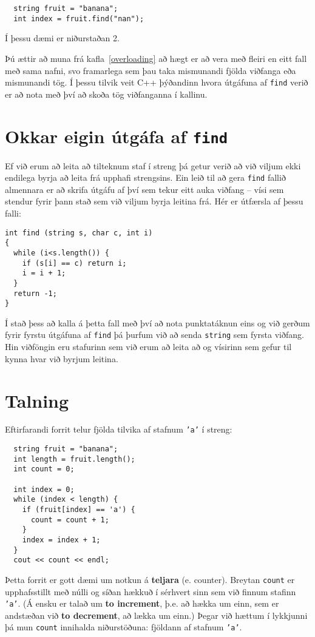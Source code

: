 \begin{verbatim}
  string fruit = "banana";
  int index = fruit.find("nan");
\end{verbatim}
%
Í þessu dæmi er niðurstaðan 2.

Þú ættir að muna frá kafla~\ref{overloading} að hægt er að vera með fleiri en eitt fall með sama nafni,
svo framarlega sem þau taka mismunandi fjölda viðfanga eða mismunandi tög.
Í þessu tilvik veit C++ þýðandinn hvora útgáfuna af {\tt find} verið er að nota með því að skoða tög viðfanganna í kallinu.

\section{Okkar eigin útgáfa af {\tt find}}

Ef við erum að leita að tilteknum staf í streng þá getur verið að við viljum ekki endilega byrja að leita frá upphafi strengsins. 
Ein leið til að gera {\tt find} fallið almennara er að skrifa útgáfu af því sem tekur eitt auka viðfang -- vísi sem stendur fyrir þann stað sem við viljum byrja leitina frá.
Hér er útfærsla af þessu falli:

\begin{verbatim}
int find (string s, char c, int i)
{
  while (i<s.length()) {
    if (s[i] == c) return i;
    i = i + 1;
  }
  return -1;
}
\end{verbatim}
%
Í stað þess að kalla á þetta fall með því að nota punktatáknun eins og við gerðum fyrir fyrstu útgáfuna af {\tt find}
þá þurfum við að senda {\tt string} sem fyrsta viðfang.
Hin viðföngin eru stafurinn sem við erum að leita að og vísirinn sem gefur til kynna hvar við byrjum leitina.

\section{Talning}
\label{loopcount}

Eftirfarandi forrit telur fjölda tilvika af stafnum {\tt 'a'} í streng:

\begin{verbatim}
  string fruit = "banana";
  int length = fruit.length();
  int count = 0;

  int index = 0;
  while (index < length) {
    if (fruit[index] == 'a') {
      count = count + 1;
    }
    index = index + 1;
  }
  cout << count << endl;
\end{verbatim}
%
Þetta forrit er gott dæmi um notkun á {\bf teljara} (e. counter).
Breytan {\tt count} er upphafsstillt með núlli og síðan hækkuð í sérhvert sinn sem við finnum stafinn {\tt 'a'}.
(Á ensku er talað um {\bf to increment}, þ.e. að hækka um einn, sem er andstæðan við {\bf to decrement}, að lækka um einn.)
Þegar við hættum í lykkjunni þá mun {\tt count} innihalda niðurstöðuna: fjöldann af stafnum {\tt 'a'}.


